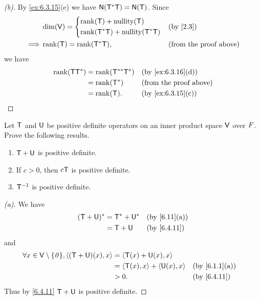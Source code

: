 \begin{proof}[(b)]
  By \cref{ex:6.3.15}(e) we have \(\ns{\T^* \T} = \ns{\T}\).
  Since
  \begin{align*}
             & \dim(\V) = \begin{dcases}
                            \rk{\T} + \nt{\T} \\
                            \rk{\T^* \T} + \nt{\T^* \T}
                          \end{dcases} &  & \text{(by \cref{2.3})}            \\
    \implies & \rk{\T} = \rk{\T^* \T},     &  & \text{(from the proof above)}
  \end{align*}
  we have
  \begin{align*}
    \rk{\T \T^*} & = \rk{\T^{**} \T^*} &  & \text{(by \cref{ex:6.3.16}(d))} \\
                 & = \rk{\T^*}         &  & \text{(from the proof above)}   \\
                 & = \rk{\T}.          &  & \text{(by \cref{ex:6.3.15}(c))}
  \end{align*}
\end{proof}

\begin{ex}\label{ex:6.4.19}
  Let \(\mathsf{T}\) and \(\mathsf{U}\) be positive definite operators on an inner product space \(\mathsf{V}\) over \(\mathit{F}\).
  Prove the following results.
  \begin{enumerate}
    \item \(\mathsf{T} + \mathsf{U}\) is positive definite.
    \item If \(c > 0\), then \(c \mathsf{T}\) is positive definite.
    \item \(\mathsf{T}^{-1}\) is positive definite.
  \end{enumerate}
\end{ex}

\begin{proof}[(a)]
  We have
  \begin{align*}
    (\T + \U)^* & = \T^* + \U^* &  & \text{(by \cref{6.11}(a))} \\
                & = \T + \U     &  & \text{(by \cref{6.4.11})}
  \end{align*}
  and
  \begin{align*}
    \forall x \in \V \setminus \set{\zv}, \inn{(\T + \U)(x), x} & = \inn{\T(x) + \U(x), x}                                           \\
                                                                & = \inn{\T(x), x} + \inn{\U(x), x} &  & \text{(by \cref{6.1.1}(a))} \\
                                                                & > 0.                              &  & \text{(by \cref{6.4.11})}
  \end{align*}
  Thus by \cref{6.4.11} \(\mathsf{T} + \mathsf{U}\) is positive definite.
\end{proof}

